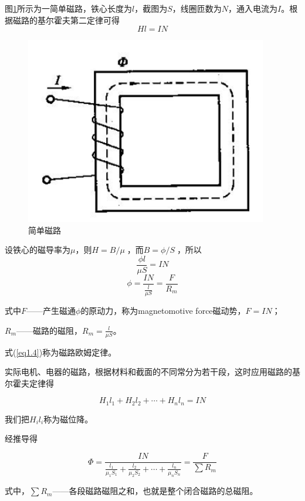 \documentclass{book}
\begin{document}
图\ref{fig:simplemag}所示为一简单磁路，铁心长度为$l$，截图为$S$，线圈匝数为$N$，通入电流为$I$。根据磁路的基尔霍夫第二定律可得
\[Hl=IN\]
\begin{figure}[H]
	\centering
	\includegraphics[width=25pc]{simplemag}
	\caption{简单磁路}
	\label{fig:simplemag}
\end{figure}


设铁心的磁导率为$\mu $，则$H={B}/{\mu }\;$，而$B={\phi }/{S}\;$，所以
\[\frac{\phi l}{\mu S}=IN\]
\begin{equation}
\phi =\frac{IN}{\frac{l}{\mu S}}=\frac{F}{{{R}_{m}}}
\label{eq1.4}
\end{equation}

式中$F$——产生磁通$\phi $的原动力，称为magnetomotive force磁动势，$F=IN$；

${{R}_{m}}$——磁路的磁阻，${{R}_{m}}=\frac{l}{\mu S}$。

式(\ref{eq1.4})称为磁路欧姆定律。



实际电机、电器的磁路，根据材料和截面的不同常分为若干段，这时应用磁路的基尔霍夫定律得

\[{{H}_{1}}{{l}_{1}}+{{H}_{2}}{{l}_{2}}+\cdots +{{H}_{n}}{{l}_{n}}=IN\]

我们把$H_il_i$称为磁位降。

经推导得

\begin{equation}
\Phi =\frac{IN}{\frac{{{l}_{1}}}{{{\mu }_{1}}{{S}_{1}}}+\frac{{{l}_{2}}}{{{\mu }_{2}}{{S}_{2}}}+\cdots +\frac{{{l}_{n}}}{{{\mu }_{n}}{{S}_{n}}}}=\frac{F}{\sum{{{R}_{m}}}}
\label{eq1.5}
\end{equation}	

式中，$\sum{{{R}_{m}}}$——各段磁路磁阻之和，也就是整个闭合磁路的总磁阻。
\end{document}
